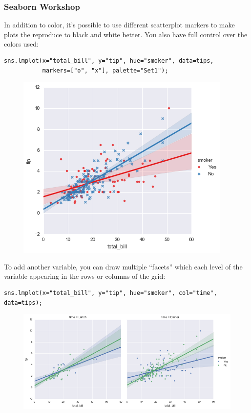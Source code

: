 \documentclass{beamer}
\begin{document}
\begin{frame}[fragile]
	\frametitle{Seaborn Workshop}
	\large
	
	In addition to color, it’s possible to use different scatterplot markers to make plots the reproduce to black and white better. You also have full control over the colors used:
\begin{verbatim}
sns.lmplot(x="total_bill", y="tip", hue="smoker", data=tips,
           markers=["o", "x"], palette="Set1");
 \end{verbatim}
\begin{figure}
	\centering
	\includegraphics[width=0.7\linewidth]{images/regression_41_0}
\end{figure}
\end{frame}
\begin{frame}[fragile]
	\large
To add another variable, you can draw multiple “facets” which each level of the variable appearing in the rows or columns of the grid:
\begin{verbatim}
sns.lmplot(x="total_bill", y="tip", hue="smoker", col="time", data=tips);
\end{verbatim}

\begin{figure}
\centering
\includegraphics[width=0.7\linewidth]{images/regression_43_0}
\end{figure}

\end{frame}
\end{document}
